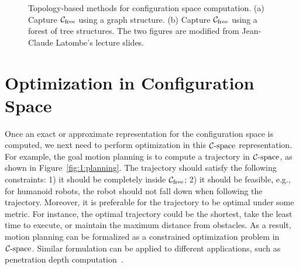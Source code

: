 \begin{figure}[htb]
  \centering
  \caption[Topology-based methods for configuration space computation]{Topology-based methods for configuration space computation. (a) Capture $\mathcal C_{\text{free}}$ using a graph structure. (b) Capture $\mathcal C_{\text{free}}$ using a forest of tree structures. The two figures are modified from Jean-Claude Latombe's lecture slides.}\label{fig:1:topologycspace}
\end{figure}




\section{Optimization in Configuration Space}
\label{sec:1:optimization}
Once an exact or approximate representation for the configuration space is computed, we next need to perform optimization in this $\mathcal C\text{-space}$ representation. For example, the goal motion planning is to compute a trajectory in $\mathcal C\text{-space}$, as shown in Figure~\ref{fig:1:planning}. The trajectory should satisfy the following constraints: 1) it should be completely inside $\mathcal C_{\text{free}}$; 2) it should be feasible, e.g., for humanoid robots, the robot should not fall down when following the trajectory. Moreover, 
it is preferable for the trajectory to be optimal under some metric. For instance, the optimal trajectory could be the shortest, take the least time to execute, or maintain the maximum distance from obstacles.
As a result, motion planning can be formalized as a constrained optimization problem in $\mathcal C\text{-space}$. Similar formulation can be applied to different applications, such as penetration depth computation~\cite{Zhang:2007:GPD,Zhang:2007:AFP,Zhang:2008:ICRA,Je:2012:PRP}.


